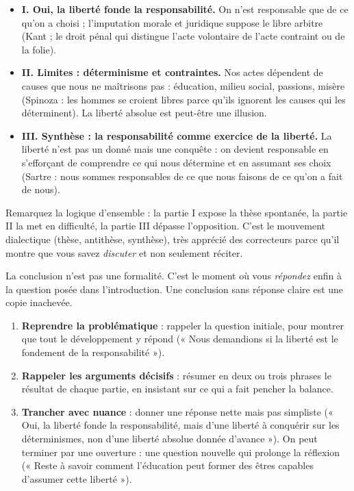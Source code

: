 \documentclass[11pt]{article}
\newcommand{\cle}[1]{{\popxbold\color{popdark}#1}}
\newcounter{popsec}
\newcounter{popsub}
\newcommand{\courssub}[1]{%
  \stepcounter{popsub}%
  \par\vspace{9pt}\noindent{\popxbold\fontsize{11.5}{13}\selectfont\color{popink}{\color{poporange}\thepopsec.\thepopsub}\hspace{6pt}#1}\par\nopagebreak\vspace{4pt}
}
\begin{document}
\begin{exemplebox}
\begin{itemize}
\item \textbf{I. Oui, la liberté fonde la responsabilité.} On n'est responsable que de ce qu'on a choisi ; l'imputation morale et juridique suppose le libre arbitre (Kant ; le droit pénal qui distingue l'acte volontaire de l'acte contraint ou de la folie).
\item \textbf{II. Limites : déterminisme et contraintes.} Nos actes dépendent de causes que nous ne maîtrisons pas : éducation, milieu social, passions, misère (Spinoza : les hommes se croient libres parce qu'ils ignorent les causes qui les déterminent). La liberté absolue est peut-être une illusion.
\item \textbf{III. Synthèse : la responsabilité comme exercice de la liberté.} La liberté n'est pas un donné mais une conquête : on devient responsable en s'efforçant de comprendre ce qui nous détermine et en assumant ses choix (Sartre : nous sommes responsables de ce que nous faisons de ce qu'on a fait de nous).
\end{itemize}
\end{exemplebox}

Remarquez la logique d'ensemble : la partie I expose la thèse spontanée, la partie II la met en difficulté, la partie III dépasse l'opposition. C'est le mouvement \cle{dialectique} (thèse, antithèse, synthèse), très apprécié des correcteurs parce qu'il montre que vous savez \emph{discuter} et non seulement réciter.

\courssub{Rédiger une conclusion justifiée}

La conclusion n'est pas une formalité. C'est le moment où vous \emph{répondez} enfin à la question posée dans l'introduction. Une conclusion sans réponse claire est une copie inachevée.

\begin{methode}
\begin{enumerate}
\item \textbf{Reprendre la problématique} : rappeler la question initiale, pour montrer que tout le développement y répond (« Nous demandions si la liberté est le fondement de la responsabilité »).
\item \textbf{Rappeler les arguments décisifs} : résumer en deux ou trois phrases le résultat de chaque partie, en insistant sur ce qui a fait pencher la balance.
\item \textbf{Trancher avec nuance} : donner une réponse nette mais pas simpliste (« Oui, la liberté fonde la responsabilité, mais d'une liberté à conquérir sur les déterminismes, non d'une liberté absolue donnée d'avance »). On peut terminer par une \cle{ouverture} : une question nouvelle qui prolonge la réflexion (« Reste à savoir comment l'éducation peut former des êtres capables d'assumer cette liberté »).
\end{enumerate}
\end{methode}
\end{document}
